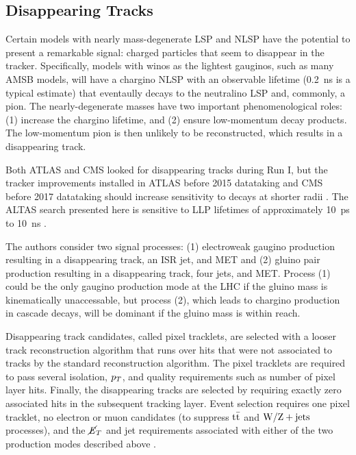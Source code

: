 \documentclass[12pt]{article}
\begin{document}
\subsection{Disappearing Tracks}
    Certain models with nearly mass-degenerate LSP and NLSP have the potential to present a remarkable signal: charged particles that seem to disappear in the tracker. Specifically, models with winos as the lightest gauginos, such as many AMSB models, will have a chargino NLSP with an observable lifetime (\SI{0.2}{\nano\s} is a typical estimate) that eventaully decays to the neutralino LSP and, commonly, a pion. The nearly-degenerate masses have two important phenomenological roles: (1) increase the chargino lifetime, and (2) ensure low-momentum decay products. The low-momentum pion is then unlikely to be reconstructed, which results in a disappearing track.

    Both ATLAS and CMS looked for disappearing tracks during Run I, but the tracker improvements installed in ATLAS before 2015 datataking and CMS before 2017 datataking should increase sensitivity to decays at shorter radii . The ALTAS search presented here is sensitive to LLP lifetimes of approximately \SI{10}{\pico\s} to \SI{10}{\nano\s} .

    The authors consider two signal processes: (1) electroweak gaugino production resulting in a disappearing track, an ISR jet, and MET and (2) gluino pair production resulting in a disappearing track, four jets, and MET. Process (1) could be the only gaugino production mode at the LHC if the gluino mass is kinematically unaccessable, but process (2), which leads to chargino production in cascade decays, will be dominant if the gluino mass is within reach.

    Disappearing track candidates, called pixel tracklets, are selected with a looser track reconstruction algorithm that runs over hits that were not associated to tracks by the standard reconstruction algorithm. The pixel tracklets are required to pass several isolation, $p_T$, and quality requirements such as number of pixel layer hits. Finally, the disappearing tracks are selected by requiring exactly zero associated hits in the subsequent tracking layer. Event selection requires one pixel tracklet, no electron or muon candidates (to suppress $\mathrm{t}\bar{\mathrm{t}}$ and $\mathrm{W}/\mathrm{Z} + \mathrm{jets}$ processes), and the $\cancel{\it{E}}_{T}$ and jet requirements associated with either of the two production modes described above .
    
\end{document}
